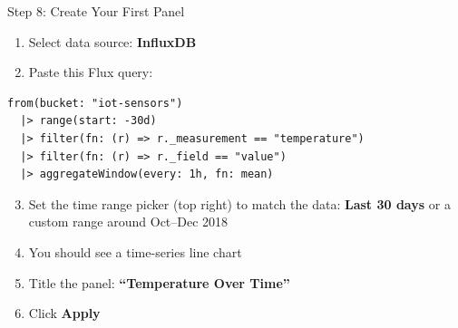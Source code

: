 \documentclass[aspectratio=169,11pt]{beamer}
\begin{document}
\begin{frame}[fragile]{Step 8: Create Your First Panel}

    \vspace{0.2cm}
    \begin{enumerate}
        \item Select data source: \textbf{InfluxDB}
        \item Paste this Flux query:
    \end{enumerate}

\begin{lstlisting}
from(bucket: "iot-sensors")
  |> range(start: -30d)
  |> filter(fn: (r) => r._measurement == "temperature")
  |> filter(fn: (r) => r._field == "value")
  |> aggregateWindow(every: 1h, fn: mean)
\end{lstlisting}

    \begin{enumerate}
        \setcounter{enumi}{2}
        \item Set the time range picker (top right) to match the data: \textbf{Last 30 days} or a custom range around Oct--Dec 2018
        \item You should see a time-series line chart
        \item Title the panel: \textbf{``Temperature Over Time''}
        \item Click \textbf{Apply}
    \end{enumerate}

    \vspace{0.1cm}
\end{frame}
\end{document}
